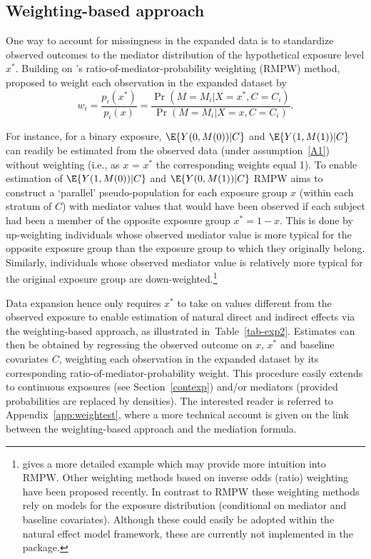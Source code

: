 \documentclass[nojss]{jss}
\begin{document}
\subsection{Weighting-based approach}
One way to account for missingness in the expanded data is to standardize observed outcomes to the mediator distribution of the hypothetical exposure level $x^*$. Building on \citeauthor{Hong2010}'s \citeyearpar{Hong2010} ratio-of-mediator-probability weighting (RMPW) method, \cite{Lange2012} proposed to weight each observation in the expanded dataset by $$w_i = \dfrac{p_i(x^*)}{p_i(x)} = \dfrac{\Pr(M = M_i \vert X = x^*, C = C_i)}{\Pr(M = M_i \vert X = x, C = C_i)}.$$
\par For instance, for a binary exposure, $\E\{Y(0,M(0))|C\}$ and $\E\{Y(1,M(1))|C\}$ can readily be estimated from the observed data (under assumption~\ref{A1}) without weighting (i.e., as $x$ = $x^*$ the corresponding weights equal 1). To enable estimation of $\E\{Y(1,M(0))|C\}$ and $\E\{Y(0,M(1))|C\}$ RMPW aims to construct a `parallel' pseudo-population for each exposure group $x$ (within each stratum of $C$) with mediator values that would have been observed if each subject had been a member of the opposite exposure group $x^* = 1-x$. This is done by up-weighting individuals whose observed mediator value is more typical for the opposite exposure group than the exposure group to which they originally belong. Similarly, individuals whose observed mediator value is relatively more typical for the original exposure group are down-weighted.\footnote{\cite{Hong2015} gives a more detailed example which may provide more intuition into RMPW. Other weighting methods based on inverse odds (ratio) weighting \citep{Huber2013, TchetgenTchetgen2013} have been proposed recently. In contrast to RMPW these weighting methods rely on models for the exposure distribution (conditional on mediator and baseline covariates). Although these could easily be adopted within the natural effect model framework, these are currently not implemented in the  package.} 
\par Data expansion hence only requires $x^*$ to take on values different from the observed exposure to enable estimation of natural direct and indirect effects via the weighting-based approach, as illustrated in~Table~\ref{tab-exp2}. Estimates can then be obtained by regressing the observed outcome on $x$, $x^*$ and baseline covariates $C$, weighting each observation in the expanded dataset by its corresponding ratio-of-mediator-probability weight. This procedure easily extends to continuous exposures (see Section~\ref{contexp}) and/or mediators (provided probabilities are replaced by densities). The interested reader is referred to Appendix~\ref{app:weightest}, where a more technical account is given on the link between the weighting-based approach and the mediation formula.
\end{document}
